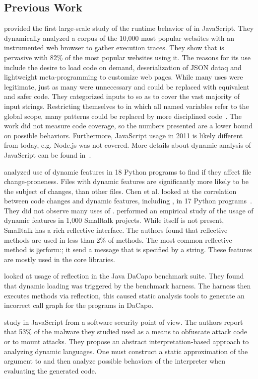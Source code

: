 \documentclass[review,screen,acmsmall,anonymous=true]{acmart}
\begin{document}
\subsection{Previous Work}

\citet{ecoop11} provided the first large-scale study of the runtime behavior of
\eval in JavaScript. They dynamically analyzed a corpus of the 10,000 most
popular websites with an instrumented web browser to gather execution traces.
They show that \eval is pervasive with 82\% of the most popular websites using
it. The reasons for its use include the desire to load code on demand,
deserialization of JSON dataq and lightweight meta-programming to customize web
pages. While many uses were legitimate, just as many were unnecessary and could
be replaced with equivalent and safer code. They categorized inputs to \eval so
as to cover the vast majority of input strings. Restricting themselves to \eval
in which all named variables refer to the global scope, many patterns could be
replaced by more disciplined code~\cite{oopsla12b, moller12}. The work did not
measure code coverage, so the numbers presented are a lower bound on possible
behaviors. Furthermore, JavaScript usage in 2011 is likely different from today,
e.g. Node.js was not covered. More details about dynamic analysis of JavaScript
can be found in~\cite{liang}.

\citet{wang} analyzed use of dynamic features in 18 Python programs to find if
they affect file change-proneness. Files with dynamic features are significantly
more likely to be the subject of changes, than other files. Chen et al. looked
at the correlation between code changes and dynamic features, including \eval,
in 17 Python programs~\cite{chen}. They did not observe many uses of \eval.
\citet{oscar} performed an empirical study of the usage of dynamic features in
1,000 Smalltalk projects. While \eval itself is not present, Smalltalk has a
rich reflective interface. The authors found that reflective methods are used in less
than 2\% of methods. The most common reflective method is \c{perform:}; it send
a message that is specified by a string. These features are mostly used in the
core libraries.

\citet{bodden} looked at usage of reflection in the Java DaCapo benchmark suite.
They found that dynamic loading was triggered by the benchmark harness. The
harness then executes methods via reflection, this caused static analysis tools
to generate an incorrect call graph for the programs in DaCapo.

\citet{Arceri21} study \eval in JavaScript from a software security point of
view. The authors report that 53\% of the malware they studied used \eval as a
means to obfuscate attack code or to mount attacks. They propose an abstract
interpretation-based approach to analyzing dynamic languages. One must construct
a static approximation of the argument to \eval and then analyze possible
behaviors of the interpreter when evaluating the generated code.
\end{document}
